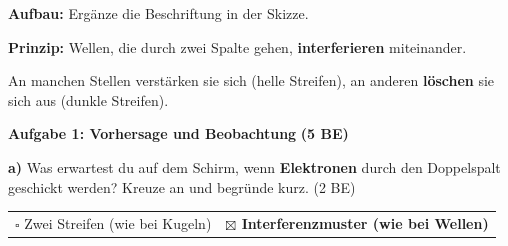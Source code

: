 \documentclass[11pt,a4paper]{article}
\newcommand{\lsg}[1]{\textcolor{loesung}{\textbf{#1}}}
\begin{document}
\begin{tcolorbox}[merkbox={Kasten 1: Doppelspalt-Experiment}]
\textbf{Aufbau:} Ergänze die Beschriftung in der Skizze.

\vspace{0.5em}
\begin{center}
\end{center}

\vspace{0.3em}
\textbf{Prinzip:} Wellen, die durch zwei Spalte gehen, \lsg{interferieren} miteinander.

An manchen Stellen verstärken sie sich (helle Streifen), an anderen \lsg{löschen} sie sich aus (dunkle Streifen).
\end{tcolorbox}

\vspace{0.5em}


\textbf{Aufgabe 1: Vorhersage und Beobachtung} \hfill \textbf{(5 BE)}

\textbf{a)} Was erwartest du auf dem Schirm, wenn \textbf{Elektronen} durch den Doppelspalt geschickt werden? Kreuze an und begründe kurz. \hfill (2 BE)

\vspace{0.3em}
\begin{tabular}{@{}p{}p{}@{}}
$\square$ Zwei Streifen (wie bei Kugeln) & \lsg{$\boxtimes$ Interferenzmuster (wie bei Wellen)} \\
\end{tabular}
\end{document}
